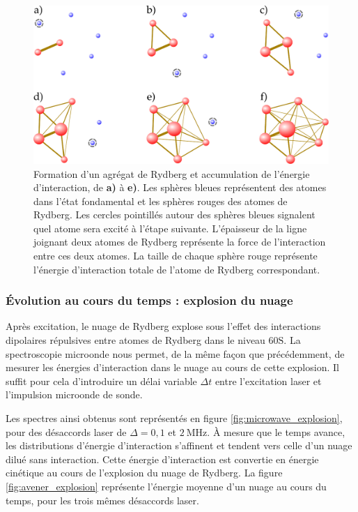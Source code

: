 \begin{figure}[h]
\centering
\includegraphics[width=.7\linewidth]{figures/low_l/accumulation_2D}
\caption[Formation d'un agrégat de Rydberg et accumulation de l'énergie d'interaction]{
Formation d'un agrégat de Rydberg et accumulation de l'énergie d'interaction, de \textbf{a)} à \textbf{e)}.
Les sphères bleues représentent des atomes dans l'état fondamental et les sphères rouges des atomes de Rydberg.
Les cercles pointillés autour des sphères bleues signalent quel atome sera excité à l'étape suivante.
L'épaisseur de la ligne joignant deux atomes de Rydberg représente la force de l'interaction entre ces deux atomes.
La taille de chaque sphère rouge représente l'énergie d'interaction totale de l'atome de Rydberg correspondant.
}
\label{fig:clustering}
\end{figure}
%

\newpage
\subsubsection*{Évolution au cours du temps : explosion du nuage}
\noindent Après excitation, le nuage de Rydberg explose sous l'effet des interactions dipolaires répulsives entre atomes de Rydberg dans le niveau $\mathrm{60S}$.
La spectroscopie microonde nous permet, de la même façon que précédemment, de mesurer les énergies d'interaction dans le nuage au cours de cette explosion.
Il suffit pour cela d'introduire un délai variable $\Delta t$ entre l'excitation laser et l'impulsion microonde de sonde.

Les spectres ainsi obtenus sont représentés en figure \eqref{fig:microwave_explosion}, pour des désaccords laser de $\Delta = 0, 1$ et $\SI{2}{\MHz}$.
\`A mesure que le temps avance, les distributions d'énergie d'interaction s'affinent et tendent vers celle d'un nuage dilué sans interaction.
Cette énergie d'interaction est convertie en énergie cinétique au cours de l'explosion du nuage de Rydberg.
La figure \eqref{fig:avener_explosion} représente l'énergie moyenne d'un nuage au cours du temps, pour les trois mêmes désaccords laser.

